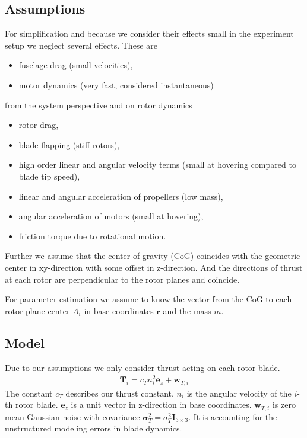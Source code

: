 \documentclass[10pt,a4paper]{article}
\begin{document}
\subsection*{Assumptions}
For simplification and because we consider their effects small in the experiment setup we neglect several effects. These are 
\begin{itemize} 
\item fuselage drag (small velocities),
\item motor dynamics (very fast, considered instantaneous)
\end{itemize}
from the system perspective and on rotor dynamics
\begin{itemize}
\item rotor drag,
\item blade flapping (stiff rotors),
\item high order linear and angular velocity terms (small at hovering compared to blade tip speed),
\item linear and angular acceleration of propellers (low mass),
\item angular acceleration of motors (small at hovering),
\item friction torque due to rotational motion.
\end{itemize}
Further we assume that the center of gravity (CoG) coincides with the geometric center in xy-direction with some offset in z-direction. And the directions of thrust at each rotor are perpendicular to the rotor planes and coincide.

For parameter estimation we assume to know the vector from the CoG  to each rotor plane center $A_i$ in base coordinates $\mathbf{r}$ and the mass $m$.

\subsection*{Model}
Due to our assumptions we only consider thrust acting on each rotor blade. 
\begin{align}
\mathbf{T}_{i} = c_T n_i^2 \mathbf{e}_z + \mathbf{w}_{T,i}
\end{align}   
The constant $c_T$ describes our thrust constant. $n_i$ is the angular velocity of the $i$-th rotor blade. $\mathbf{e}_z$ is a unit vector in z-direction in base coordinates. $\mathbf{w}_{T,i}$ is zero mean Gaussian noise with covariance $\boldsymbol{\sigma}_T^2 = \sigma_T^2 \mathbf{I}_{3\times3}$. It is accounting for the unstructured modeling errors in blade dynamics.
\end{document}
